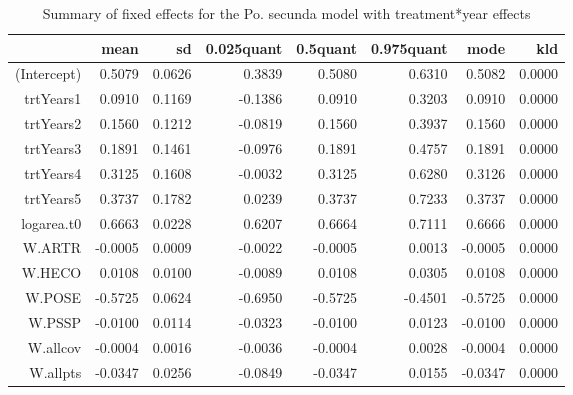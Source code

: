 \begin{table}[ht]
\centering
\caption{Summary of fixed effects for the Po. secunda model with treatment*year effects} 
\label{POSEgrowth-trtYears}
\begin{tabular}{rrrrrrrr}
  \hline
 & mean & sd & 0.025quant & 0.5quant & 0.975quant & mode & kld \\ 
  \hline
(Intercept) & 0.5079 & 0.0626 & 0.3839 & 0.5080 & 0.6310 & 0.5082 & 0.0000 \\ 
  trtYears1 & 0.0910 & 0.1169 & -0.1386 & 0.0910 & 0.3203 & 0.0910 & 0.0000 \\ 
  trtYears2 & 0.1560 & 0.1212 & -0.0819 & 0.1560 & 0.3937 & 0.1560 & 0.0000 \\ 
  trtYears3 & 0.1891 & 0.1461 & -0.0976 & 0.1891 & 0.4757 & 0.1891 & 0.0000 \\ 
  trtYears4 & 0.3125 & 0.1608 & -0.0032 & 0.3125 & 0.6280 & 0.3126 & 0.0000 \\ 
  trtYears5 & 0.3737 & 0.1782 & 0.0239 & 0.3737 & 0.7233 & 0.3737 & 0.0000 \\ 
  logarea.t0 & 0.6663 & 0.0228 & 0.6207 & 0.6664 & 0.7111 & 0.6666 & 0.0000 \\ 
  W.ARTR & -0.0005 & 0.0009 & -0.0022 & -0.0005 & 0.0013 & -0.0005 & 0.0000 \\ 
  W.HECO & 0.0108 & 0.0100 & -0.0089 & 0.0108 & 0.0305 & 0.0108 & 0.0000 \\ 
  W.POSE & -0.5725 & 0.0624 & -0.6950 & -0.5725 & -0.4501 & -0.5725 & 0.0000 \\ 
  W.PSSP & -0.0100 & 0.0114 & -0.0323 & -0.0100 & 0.0123 & -0.0100 & 0.0000 \\ 
  W.allcov & -0.0004 & 0.0016 & -0.0036 & -0.0004 & 0.0028 & -0.0004 & 0.0000 \\ 
  W.allpts & -0.0347 & 0.0256 & -0.0849 & -0.0347 & 0.0155 & -0.0347 & 0.0000 \\ 
   \hline
\end{tabular}
\end{table}


